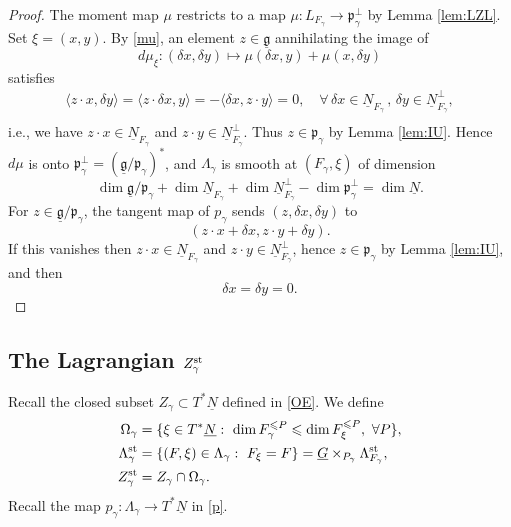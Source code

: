\documentclass[11pt,reqno]{amsart}
\theoremstyle{definition}
\theoremstyle{remark}
\def\dN{\underline N}
\def\dG{\underline G}
\def\dg{\underline{\mathfrak g}}
\def\frakp{\mathfrak p}
\begin{document}
\begin{proof}
The moment map $\mu$ restricts to a map
$\mu:L_{F_\gamma}\to\frakp_\gamma^\perp$ 
by Lemma \ref{lem:LZL}.
Set $\xi=(x,y)$.
By \eqref{mu}, an element $z\in\dg$ annihilating the image of 
$$d\mu_{\xi}:(\delta x,\delta y)\mapsto\mu(\delta x,y)+\mu(x,\delta y)$$ satisfies
\begin{align*}
\langle z\cdot x,\delta y\rangle=
\langle z\cdot\delta x,y\rangle=-\langle\delta x,z\cdot y\rangle=0
,\quad\forall\,\delta x\in\dN_{F_\gamma}\,,\,\delta y\in\dN_{F_\gamma}^\perp,\\
\end{align*} 
i.e., we have
$z\cdot x\in\dN_{F_\gamma}$ and $z\cdot y\in\dN_{F_\gamma}^\perp.$
Thus $z\in\frakp_\gamma$ by Lemma \ref{lem:IU}. 
Hence $d\mu$ is onto
$\frakp_\gamma^\perp=(\dg/\frakp_\gamma)^*$, and $\Lambda_\gamma$ is smooth at $(F_\gamma,\xi)$ of dimension
$$\dim\dg/\frakp_\gamma+\dim\dN_{F_\gamma}+\dim\dN_{F_\gamma}^\perp-\dim\frakp_\gamma^\perp=\dim\dN.$$
For $z\in\dg/\frakp_\gamma$, the tangent map of $p_\gamma$ sends $(z,\delta x,\delta y)$
to $$(z\cdot x+\delta x,z\cdot y+\delta y).$$
If this vanishes then $z\cdot x\in\dN_{F_\gamma}$ and $z\cdot y\in\dN_{F_\gamma}^\perp$, 
hence $z\in\frakp_\gamma$ by Lemma \ref{lem:IU}, and then $$\delta x=\delta y=0.$$
\end{proof}

\subsection{The Lagrangian $Z^{\rm st}_\gamma$}\label{subsec:Zst}
Recall the closed subset $Z_\gamma\subset T^*\dN$ defined in \eqref{OE}. We define
\begin{align}\label{OLZ}
\begin {split}
\Omega_\gamma&=\{\xi\in T^*\dN:\ \dim F_\gamma^{\leqslant P}\leqslant \dim F_\xi^{\leqslant P},\ \forall P\},\\
\Lambda^{\rm st}_\gamma&=\{(F,\xi)\in\Lambda_\gamma:\ F_\xi=F\}=\dG\times_{P_\gamma}\Lambda^{\rm st}_{F_\gamma},\\
Z^{\rm st}_\gamma&=Z_\gamma\cap\Omega_\gamma.
\end{split}
\end{align}
Recall the map $p_\gamma:\Lambda_\gamma\to T^*\dN$ in \eqref{p}.
\end{document}
